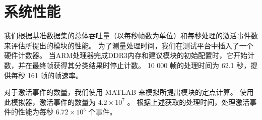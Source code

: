 




\section{系统性能}

我们根据基准数据集的总体吞吐量（以每秒帧数为单位）和每秒处理的激活事件数来评估所提出的模块的性能。
为了测量处理时间，我们在测试平台中插入了一个硬件计数器。
当ARM处理器完成DDR3内存和建议模块的初始配置时，它开始计数，并在最终帧获得其分类结果时停止计数。
10 000 帧的处理时间为 62.1 秒，提供每秒 161 帧的帧速率。

对于激活事件的数量，我们使用 MATLAB 来模拟所提出模块的定点计算。 
使用此模拟器，激活事件的数量为 $4.2 \times 10^7$ 。
根据上述获取的处理时间，处理激活事件的性能为每秒 $6.72 \times 10^5$ 个事件。


